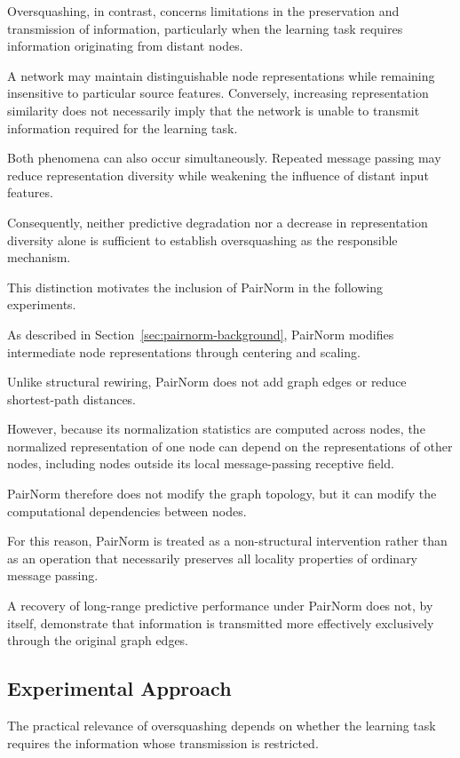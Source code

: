 \documentclass[english]{lni}
\begin{document}
Oversquashing, in contrast, concerns limitations in the
preservation and transmission of information, particularly
when the learning task requires information originating
from distant nodes.

A network may maintain distinguishable node representations
while remaining insensitive to particular source features.
Conversely, increasing representation similarity does
not necessarily imply that the network is unable to
transmit information required for the learning task.

Both phenomena can also occur simultaneously. Repeated
message passing may reduce representation diversity while
weakening the influence of distant input features.

Consequently, neither predictive degradation nor a decrease
in representation diversity alone is sufficient to
establish oversquashing as the responsible mechanism.

This distinction motivates the inclusion of PairNorm in
the following experiments.

As described in Section~\ref{sec:pairnorm-background},
PairNorm modifies intermediate node representations
through centering and scaling.

Unlike structural rewiring, PairNorm does not add graph
edges or reduce shortest-path distances.

However, because its normalization statistics are computed
across nodes, the normalized representation of one node
can depend on the representations of other nodes, including
nodes outside its local message-passing receptive field.

PairNorm therefore does not modify the graph topology, but
it can modify the computational dependencies between nodes.

For this reason, PairNorm is treated as a non-structural
intervention rather than as an operation that necessarily
preserves all locality properties of ordinary message
passing.

A recovery of long-range predictive performance under
PairNorm does not, by itself, demonstrate that information
is transmitted more effectively exclusively through the
original graph edges.

\subsection{Experimental Approach}
\label{sec:oversquashing-experimental-approach}

The practical relevance of oversquashing depends on whether
the learning task requires the information whose transmission
is restricted.
\end{document}
